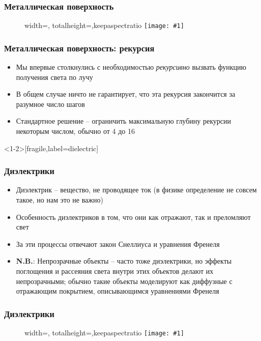 \documentclass[10pt,handout]{beamer}
\newcommand{\slideimage}[1]{
  \begin{figure}
    \begin{adjustbox}{width=\textwidth, totalheight=\textheight-2\baselineskip-2\baselineskip,keepaspectratio}
      \texttt{[image: \#1]}
    \end{adjustbox}
  \end{figure}
}
\begin{document}
\begin{frame}[fragile]
\frametitle{Металлическая поверхность}
\slideimage{reflection.png}
\end{frame}

\begin{frame}[fragile]
\frametitle{Металлическая поверхность: рекурсия}
\begin{itemize}
\item Мы впервые столкнулись с необходимостью \textit{рекурсивно} вызвать функцию получения света по лучу
\pause
\item В общем случае ничто не гарантирует, что эта рекурсия закончится за разумное число шагов
\pause
\item Стандартное решение -- ограничить максимальную глубину рекурсии некоторым числом, обычно от 4 до 16
\end{itemize}
\end{frame}





\begin{frame}<1-2>[fragile,label=dielectric]
\frametitle{Диэлектрики}
\begin{itemize}
\item Диэлектрик -- вещество, не проводящее ток (в физике определение не совсем такое, но нам это не важно)
\pause
\item Особенность диэлектриков в том, что они как отражают, так и преломляют свет
\pause
\item За эти процессы отвечают закон Снеллиуса и уравнения Френеля
\pause
\item \alert{\textbf{N.B.}}: Непрозрачные объекты -- часто тоже диэлектрики, но эффекты поглощения и рассеяния света внутри этих объектов делают их непрозрачными; обычно такие объекты моделируют как диффузные с отражающим покрытием, описывающимся уравнениями Френеля
\end{itemize}
\end{frame}

\begin{frame}[fragile]
\frametitle{Диэлектрики}
\slideimage{dielectric.jpg}
\end{frame}

\end{document}
